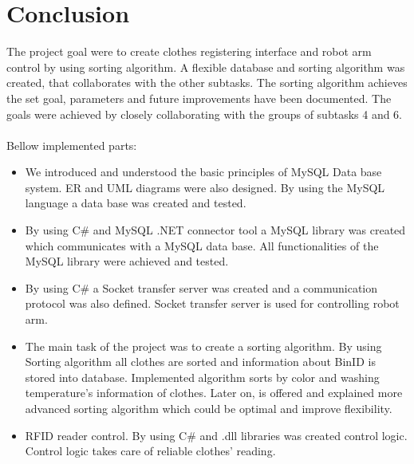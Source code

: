 \section{Conclusion}


The project goal were to create clothes registering interface and robot arm control by using sorting algorithm. A flexible database and sorting algorithm was created, that collaborates with the other subtasks. The sorting algorithm achieves the set goal, parameters and future improvements have been documented. The goals were achieved by closely collaborating with the groups of subtasks 4 and 6. 
\\ \\
Bellow implemented parts:
\\
\begin{itemize}
	\item We introduced and understood the basic principles of MySQL Data base system. ER and UML diagrams were also designed. By using the MySQL language a data base was created and tested.

	\item By using C\# and MySQL .NET connector tool a MySQL library was created which communicates with a MySQL data base. All functionalities of the MySQL library were achieved and tested.

	\item By using C\# a Socket transfer server was created and a communication protocol was also defined. Socket transfer server is used for controlling robot arm.

	\item The main task of the project was to create a sorting algorithm. By using Sorting algorithm all clothes are sorted and information about BinID is stored into
database. Implemented algorithm sorts by color and washing temperature's information of clothes. Later on, is offered and explained more advanced sorting algorithm which could be optimal and improve flexibility.

	\item RFID reader control. By using C\# and .dll libraries was created control logic. Control logic takes care of reliable clothes' reading.
\end{itemize}